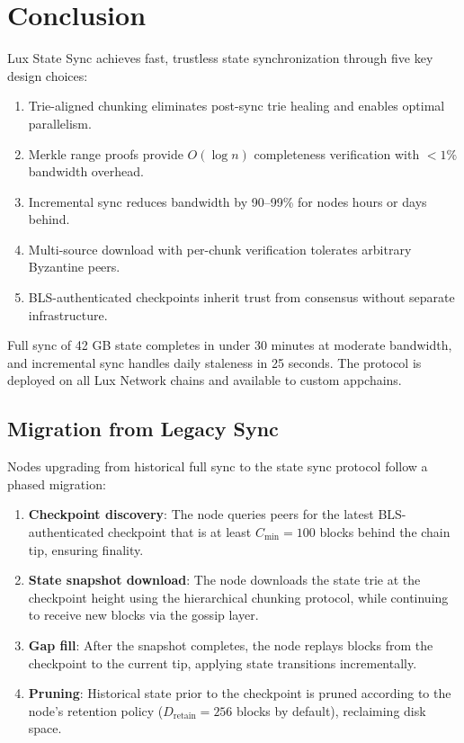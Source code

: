 \section{Conclusion}
\label{sec:conclusion}

Lux State Sync achieves fast, trustless state synchronization through five key design choices:

\begin{enumerate}
    \item Trie-aligned chunking eliminates post-sync trie healing and enables optimal parallelism.
    \item Merkle range proofs provide $O(\log n)$ completeness verification with $< 1\%$ bandwidth overhead.
    \item Incremental sync reduces bandwidth by 90--99\% for nodes hours or days behind.
    \item Multi-source download with per-chunk verification tolerates arbitrary Byzantine peers.
    \item BLS-authenticated checkpoints inherit trust from consensus without separate infrastructure.
\end{enumerate}

Full sync of 42 GB state completes in under 30 minutes at moderate bandwidth, and incremental sync handles daily staleness in 25 seconds. The protocol is deployed on all Lux Network chains and available to custom appchains.

\subsection{Migration from Legacy Sync}

Nodes upgrading from historical full sync to the state sync protocol follow a phased migration:

\begin{enumerate}
    \item \textbf{Checkpoint discovery}: The node queries peers for the latest BLS-authenticated checkpoint that is at least $C_{\min} = 100$ blocks behind the chain tip, ensuring finality.
    \item \textbf{State snapshot download}: The node downloads the state trie at the checkpoint height using the hierarchical chunking protocol, while continuing to receive new blocks via the gossip layer.
    \item \textbf{Gap fill}: After the snapshot completes, the node replays blocks from the checkpoint to the current tip, applying state transitions incrementally.
    \item \textbf{Pruning}: Historical state prior to the checkpoint is pruned according to the node's retention policy ($D_{\text{retain}} = 256$ blocks by default), reclaiming disk space.
\end{enumerate}

